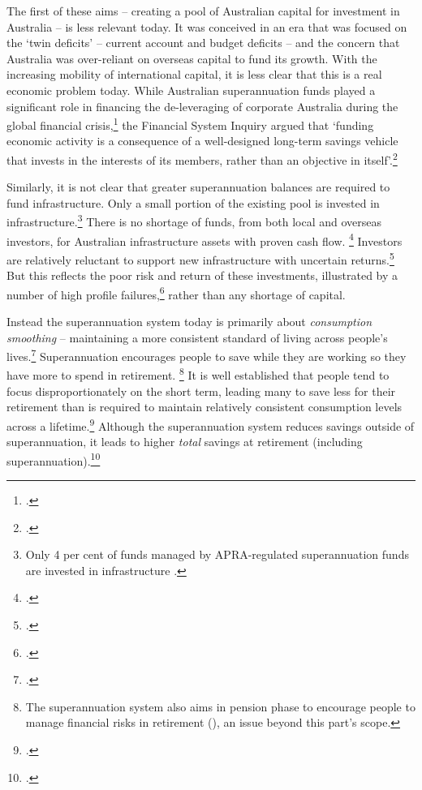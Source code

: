 The first of these aims – creating a pool of Australian capital for investment in Australia – is less relevant today. It was conceived in an era that was focused on the ‘twin deficits’ – current account and budget deficits – and the concern that Australia was over-reliant on overseas capital to fund its growth. With the increasing mobility of international capital, it is less clear that this is a real economic problem today. While Australian superannuation funds played a significant role in financing the de-leveraging of corporate Australia during the global financial crisis,\footcites{Henry2009}{RBA2014FinancialSystemInquirySubmission} the Financial System Inquiry argued that ‘funding economic activity is a consequence of a well-designed long-term savings vehicle that invests in the interests of its members, rather than an objective in itself’.\footcite[][98]{FinancialSystemsInquiry2015}

Similarly, it is not clear that greater superannuation balances are required to fund infrastructure. Only a small portion of the existing pool is invested in infrastructure.\footnote{Only 4 per cent of funds managed by APRA-regulated superannuation funds are invested in infrastructure \textcite[][Table~1d]{APRA2015a}.} 
There is no shortage of funds, from both local and overseas investors, for Australian infrastructure assets with proven cash flow.%
\footcite[][188]{ProductivityCommission2013PublicInfrastructure}
Investors are relatively reluctant to support new infrastructure with uncertain returns.\footcite[][131]{ProductivityCommission2013PublicInfrastructure}  But this reflects the poor risk and return of these investments, illustrated by a number of high profile failures,\footcite[][10]{ElaurantMcDougall2015} rather than any shortage of capital.

Instead the superannuation system today is primarily about \emph{consumption smoothing} – maintaining a more consistent standard of living across people’s lives.\footcite[][288]{MirrleesAdamBesleyEtAl2011} Superannuation encourages people to save while they are working so they have more to spend in retirement.%
\footnote{The superannuation system also aims in pension phase to encourage people to manage financial risks in retirement (\textcite{MaddockKing2015}), an issue beyond this part’s scope.} %
 It is well established that people tend to focus disproportionately on the short term, leading many to save less for their retirement than is required to maintain relatively consistent consumption levels across a lifetime.\footcite[][4]{FinancialSystemsInquiry2015} Although the superannuation system reduces savings outside of superannuation, it leads to higher \emph{total} savings at retirement (including superannuation).\footcites{GruenSoding2011}{Connolly2007}

